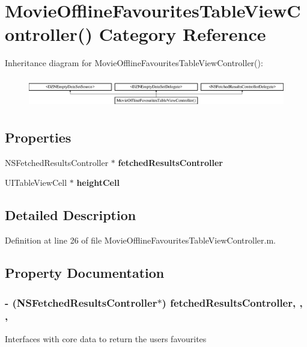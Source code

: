 \section{Movie\+Offline\+Favourites\+Table\+View\+Controller() Category Reference}
\label{category_movie_offline_favourites_table_view_controller_07_08}
Inheritance diagram for Movie\+Offline\+Favourites\+Table\+View\+Controller()\+:\begin{figure}[H]
\begin{center}
\leavevmode
\includegraphics[height=1.352657cm]{category_movie_offline_favourites_table_view_controller_07_08}
\end{center}
\end{figure}
\subsection*{Properties}
\begin{DoxyCompactItemize}
\item 
N\+S\+Fetched\+Results\+Controller $\ast$ {\bf fetched\+Results\+Controller}
\item 
U\+I\+Table\+View\+Cell $\ast$ {\bf height\+Cell}
\end{DoxyCompactItemize}


\subsection{Detailed Description}


Definition at line 26 of file Movie\+Offline\+Favourites\+Table\+View\+Controller.\+m.



\subsection{Property Documentation}
\subsubsection[{fetched\+Results\+Controller}]{\setlength{\rightskip}{0pt plus 5cm}-\/ (N\+S\+Fetched\+Results\+Controller$\ast$) fetched\+Results\+Controller\hspace{0.3cm}{\ttfamily [read]}, {\ttfamily [write]}, {\ttfamily [nonatomic]}, {\ttfamily [strong]}}\label{category_movie_offline_favourites_table_view_controller_07_08_ac01e178ee675334b58300d6a8a489d9b}
Interfaces with core data to return the user\textquotesingle{}s favourites 

